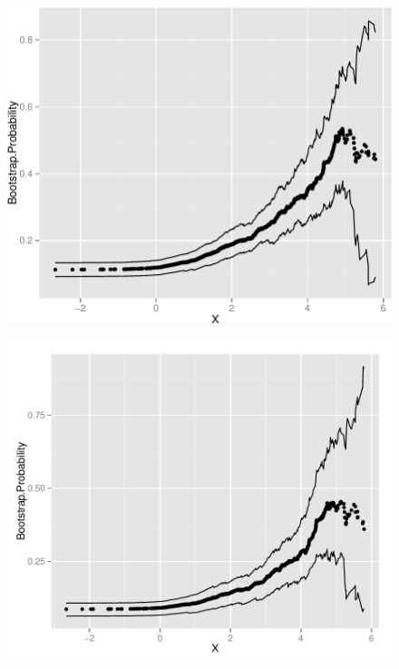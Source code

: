 \documentclass[11pt,]{article}
\begin{document}
\begin{figure}[htbp]
\centering
\includegraphics{manuscript_files/figure-latex/who_drink_cp_plot-1.pdf}
\caption{}
\end{figure}

\newpage

\begin{figure}[htbp]
\centering
\includegraphics{manuscript_files/figure-latex/epa_adult_cp -1.pdf}
\caption{}
\end{figure}

\newpage
\end{document}
